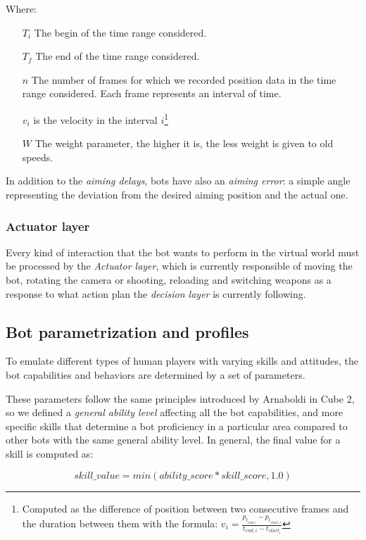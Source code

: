 Where:
\begin{itemize}
\item[$T_i$] The begin of the time range considered.
\item[$T_f$] The end of the time range considered.
\item[$n$] The number of frames for which we recorded position data in the time range considered. Each frame represents an interval of time.
\item[$v_i$] is the velocity in the interval $i$\footnote{Computed as the difference of position between two consecutive frames and the duration between them with the formula: $v_i = \frac{p_{t_{end,i}} - p_{t_{start,i}}}{t_{end,i} - t_{start_i}}$
}
\item[$W$] The weight parameter, the higher it is, the less weight is given to old speeds.
\end{itemize}

In addition to the \textit{aiming delays}, bots have also an \textit{aiming error}: a simple angle representing the deviation from the desired aiming position and the actual one.

\subsubsection{Actuator layer}
Every kind of interaction that the bot wants to perform in the virtual world must be processed by the \textit{Actuator layer}, which is currently responsible of moving the bot, rotating the camera or shooting, reloading and switching weapons as a response to what action plan the \textit{decision layer} is currently following.

\subsection{Bot parametrization and profiles}
To emulate different types of human players with varying skills and attitudes, the bot capabilities and behaviors are determined by a set of parameters.

These parameters follow the same principles introduced by Arnaboldi in Cube 2\cite{arnaboldi_framework}, so we defined a \textit{general ability level} affecting all the bot capabilities, and more specific skills that determine a bot proficiency in a particular area compared to other bots with the same general ability level.
In general, the final value for a skill is computed as:

\begin{equation}
skill\_value = min(ability\_score * skill\_score, 1.0)
\label{eq:skill_value}
\end{equation}


